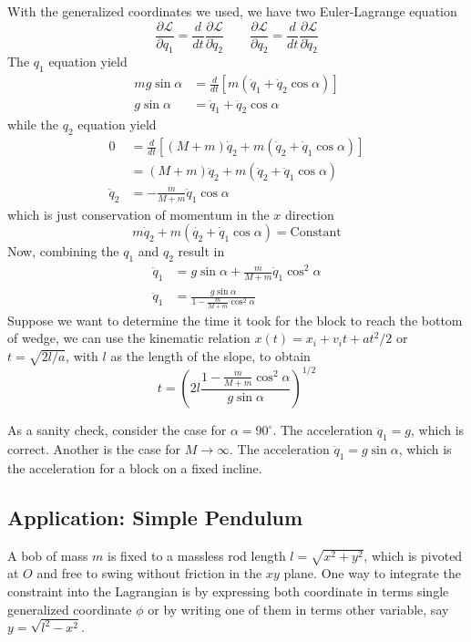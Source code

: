 \documentclass[../../../main.tex]{subfiles}
\begin{document}
With the generalized coordinates we used, we have two Euler-Lagrange equation
\begin{equation*}
	\frac{\partial \mathcal{L}}{\partial q_1}=\frac{d}{dt}\frac{\partial \mathcal{L}}{\partial \dot{q}_2}\qquad\frac{\partial \mathcal{L}}{\partial q_2}=\frac{d}{dt}\frac{\partial \mathcal{L}}{\partial \dot{q}_2}
\end{equation*}
The $q_1$ equation yield
\begin{align*}
	mg\sin\alpha & =\frac{d}{dt}\left[m(\dot{q}_1+\dot{q}_2\cos\alpha)\right] \\
	g\sin\alpha  & =\ddot{q}_1+\ddot{q}_2\cos\alpha
\end{align*}
while the $q_2$ equation yield
\begin{align*}
	0          & =\frac{d}{dt}\left[(M+m)\dot{q}_2+m(\dot{q}_2+\dot{q}_1\cos\alpha)\right] \\
	           & =(M+m)\ddot{q}_2+m(\ddot{q}_2+\ddot{q}_1\cos\alpha)                       \\
	\ddot{q}_2 & =-\frac{m}{M+m}\ddot{q}_1\cos\alpha
\end{align*}
which is just conservation of momentum in the $x$ direction
\begin{equation*}
	m\dot{q}_2+m\left(\dot{q_2}+\dot{q}_1\cos\alpha\right)=\text{Constant}
\end{equation*}
Now, combining the $q_1$ and $q_2$ result in
\begin{align*}
	\ddot{q}_1 & =g\sin\alpha+\frac{m}{M+m}\ddot{q}_1\cos^2\alpha \\
	\ddot{q}_1 & =\frac{g\sin\alpha}{1-\frac{m}{M+m}\cos^2\alpha}
\end{align*}
Suppose we want to determine the time it took for the block to reach the bottom of wedge, we can use the kinematic relation $x(t)=x_i+v_it+at^2/2$ or $t=\sqrt{2l/a}$, with $l$ as the length of the slope, to obtain
\begin{equation*}
	t=\left(2l\frac{1-\frac{m}{M+m}\cos^2\alpha}{g\sin\alpha}\right)^{1/2}
\end{equation*}

As a sanity check, consider the case for $\alpha=90^\circ$.
The acceleration $\ddot{q}_1=g$, which is correct.
Another is the case for $M\rightarrow\infty$.
The acceleration $\ddot{q}_1=g\sin\alpha$, which is the acceleration for a block on a fixed incline.


\subsection{Application: Simple Pendulum}
A bob of mass $m$ is fixed to a massless rod length $l=\sqrt{x^2+y^2}$, which is pivoted at $O$ and free to swing without friction in the $xy$ plane.
One way to integrate the constraint into the Lagrangian is by expressing both coordinate in terms single generalized coordinate $\phi$ or by writing one of them in terms other variable, say  $y=\sqrt{l^2-x^2}$.
\end{document}
